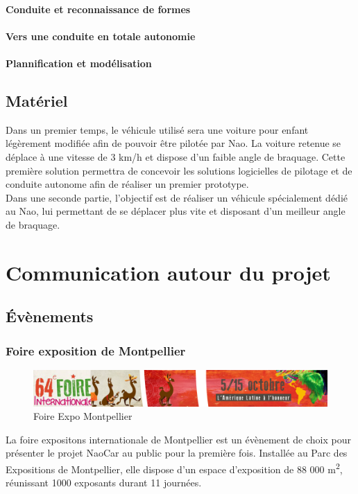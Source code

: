 \documentclass[11pt]{report} %
\begin{document}
			\paragraph{Conduite et reconnaissance de formes}
			\paragraph{Vers une conduite en totale autonomie}
			\paragraph{Plannification et modélisation}
		\subsection{Matériel}
			Dans un premier temps, le véhicule utilisé sera une voiture pour enfant légèrement modifiée afin de pouvoir être pilotée par Nao. La voiture retenue se déplace à une vitesse de 3 km/h et dispose d'un faible angle de braquage. Cette première solution permettra de concevoir les solutions logicielles de pilotage et de conduite autonome afin de réaliser un premier prototype.\\
			Dans une seconde partie, l'objectif est de réaliser un véhicule spécialement dédié au Nao, lui permettant de se déplacer plus vite et disposant d'un meilleur angle de braquage.
	\section{Communication autour du projet}
		\subsection{Évènements}
			\subsubsection{Foire exposition de Montpellier}
				\begin{figure}[htb]
				\centering
				\includegraphics[width=1\textwidth]{foire-expo.png}
				\caption{Foire Expo Montpellier}
				\label{fig:Foire Expo Montpellier}
				\end{figure}
				La foire expositons internationale de Montpellier est un évènement de choix pour présenter le projet NaoCar au public pour la première fois. Installée au Parc des Expositions de Montpellier, elle dispose d'un espace d'exposition de 88 000 m\textsuperscript{2}, réunissant 1000 exposants durant 11 journées.
\end{document}
